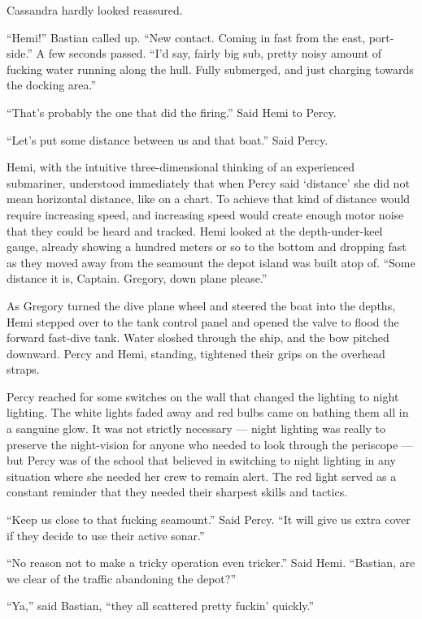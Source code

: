 \documentclass[]{scrbook}
\begin{document}
Cassandra hardly looked reassured.

``Hemi!'' Bastian called up. ``New contact. Coming in fast from the
east, port-side.'' A few seconds passed. ``I'd say, fairly big sub,
pretty noisy amount of fucking water running along the hull. Fully
submerged, and just charging towards the docking area.''

``That's probably the one that did the firing.'' Said Hemi to Percy.

``Let's put some distance between us and that boat.'' Said Percy.

Hemi, with the intuitive three-dimensional thinking of an experienced
submariner, understood immediately that when Percy said `distance' she
did not mean horizontal distance, like on a chart. To achieve that kind
of distance would require increasing speed, and increasing speed would
create enough motor noise that they could be heard and tracked. Hemi
looked at the depth-under-keel gauge, already showing a hundred meters
or so to the bottom and dropping fast as they moved away from the
seamount the depot island was built atop of. ``Some distance it is,
Captain. Gregory, down plane please.''

As Gregory turned the dive plane wheel and steered the boat into the
depths, Hemi stepped over to the tank control panel and opened the valve
to flood the forward fast-dive tank. Water sloshed through the ship, and
the bow pitched downward. Percy and Hemi, standing, tightened their
grips on the overhead straps.

Percy reached for some switches on the wall that changed the lighting to
night lighting. The white lights faded away and red bulbs came on
bathing them all in a sanguine glow. It was not strictly necessary ---
night lighting was really to preserve the night-vision for anyone who
needed to look through the periscope --- but Percy was of the school
that believed in switching to night lighting in any situation where she
needed her crew to remain alert. The red light served as a constant
reminder that they needed their sharpest skills and tactics.

``Keep us close to that fucking seamount.'' Said Percy. ``It will give
us extra cover if they decide to use their active sonar.''

``No reason not to make a tricky operation even tricker.'' Said Hemi.
``Bastian, are we clear of the traffic abandoning the depot?''

``Ya,'' said Bastian, ``they all scattered pretty fuckin' quickly.''
\end{document}
